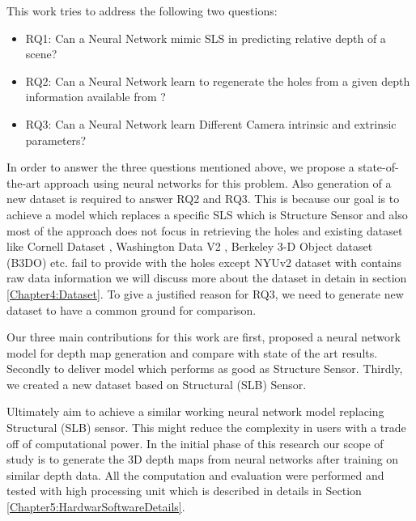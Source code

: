 This work tries to address the following two questions:
\begin{itemize}
    \item RQ1: Can a Neural Network mimic SLS in predicting relative depth of a scene?
    \item RQ2: Can a Neural Network learn to regenerate the holes from a given depth information available from ?
    \item RQ3: Can a Neural Network learn Different Camera intrinsic and extrinsic parameters?  
\end{itemize}

In order to answer the three questions mentioned above, we propose a state-of-the-art approach using neural networks for this problem. Also generation of a new dataset is required to answer RQ2 and RQ3. This is because our goal is to achieve a model which replaces a specific SLS which is Structure Sensor and also most of the approach does not focus in retrieving the holes and existing dataset like Cornell Dataset \cite{3Dscene} , Washington Data V2 \cite{Washington}, Berkeley 3-D Object dataset (B3DO) \cite{Janoch:EECS-2012-85} etc. fail to provide with the holes except NYUv2 dataset with contains raw data information we will discuss more about the dataset in detain in section \ref{Chapter4:Dataset}. To give a justified reason for RQ3, we need to generate new dataset to have a common ground for comparison. 

Our three main contributions for this work are first, proposed a neural network model for depth map generation and compare with state of the art results. Secondly to deliver model which performs as good as Structure Sensor. Thirdly,  we created a new dataset based on Structural (SLB) Sensor.

Ultimately aim to achieve a similar working neural network model replacing Structural (SLB) sensor. This might reduce the complexity in users with a trade off of computational power. In the initial phase of this research our scope of study is to generate the 3D depth maps from neural networks after training on similar depth data. All the computation and evaluation were performed and tested with high processing unit which is described in details in Section \ref{Chapter5:HardwarSoftwareDetails}.


